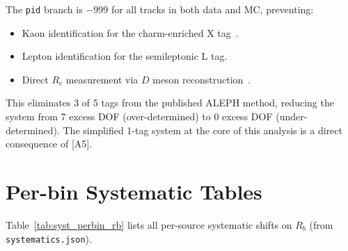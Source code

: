 \documentclass[11pt,a4paper]{article}
\begin{document}
The \texttt{pid} branch is $-999$ for all tracks in both data and MC, preventing:
\begin{itemize}
\item Kaon identification for the charm-enriched X tag~\cite{ALEPH:Rb:1996}.
\item Lepton identification for the semileptonic L tag.
\item Direct $R_c$ measurement via $D$ meson reconstruction~\cite{ALEPH:Rc}.
\end{itemize}

This eliminates 3 of 5 tags from the published ALEPH method, reducing the system from
7 excess DOF (over-determined) to 0 excess DOF (under-determined). The simplified
1-tag system at the core of this analysis is a direct consequence of [A5].

\clearpage


\clearpage
\appendix

\section{Per-bin Systematic Tables}
\label{app:syst-tables}

Table~\ref{tab:syst_perbin_rb} lists all per-source systematic shifts on $R_b$
(from \texttt{systematics.json}).
\end{document}
